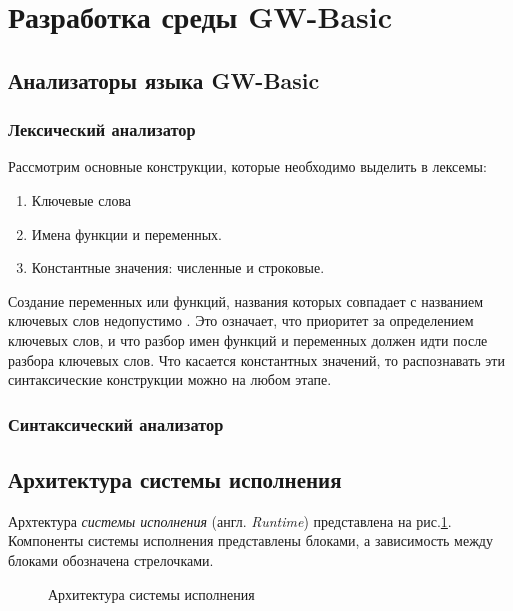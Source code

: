 \documentclass[12pt]{article}
\begin{document}
	\newpage
	\section{Разработка среды GW-Basic}
		\subsection{Анализаторы языка GW-Basic}
			\subsubsection{Лексический анализатор}
			\label{subsec:lexAnalyzer}
				\hspace{\parindent} Рассмотрим основные конструкции, которые необходимо выделить в лексемы:
				\begin{enumerate}
					\item Ключевые слова
					\item Имена функции и переменных.
					\item Константные значения: численные и строковые.
				\end{enumerate}
				
				\indent Создание переменных или функций, названия которых совпадает с названием ключевых слов недопустимо \cite{basicManual}. Это означает, что приоритет за определением ключевых слов, и что разбор имен функций и переменных должен идти после разбора ключевых слов. Что касается константных значений, то распознавать эти синтаксические конструкции можно на любом этапе.
			\subsubsection{Синтаксический анализатор}
			\label{subsec:syntaxAnalyzer}
				
				
		\subsection{Архитектура системы исполнения}
			\label{subsec:runtimeArch}
			\hspace{\parindent} Архтектура {\it системы исполнения} (англ. {\it Runtime}) представлена на рис.\ref{fig:runtimeArch}. Компоненты системы исполнения представлены блоками, а зависимость между блоками обозначена стрелочками. 	
			\begin{figure}[h]
				\caption{Архитектура системы исполнения}
				\label{fig:runtimeArch}
			\end{figure}
			
\end{document}
